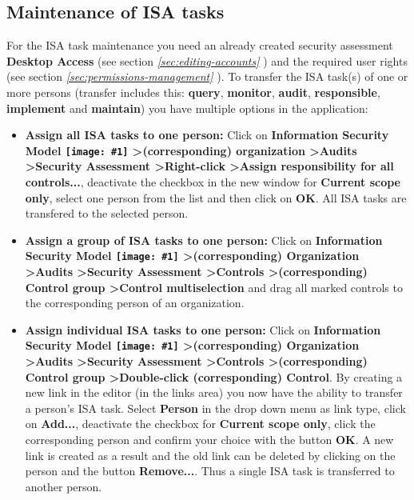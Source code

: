 \documentclass[a4paper,10pt]{book}
\newcommand{\icon}[1]{\texttt{[image: \#1]}}
\begin{document}
\subsection{Maintenance of ISA tasks}

For the ISA task maintenance you need an already created security assessment \textbf{Desktop Access} (see section {\em \ref{sec:editing-accounts} }) and the required user rights (see section {\em \ref{sec:permissions-management} }).
To transfer the ISA task(s) of one or more persons (transfer includes this: \textbf{query}, \textbf{monitor}, \textbf{audit},
\textbf{responsible}, \textbf{implement} and \textbf{maintain}) you have multiple options in the application:
\begin{itemize}
\item \textbf{Assign all ISA tasks to one person:} Click on \textbf{Information Security Model \icon{Icon/Informationssicherheitsmodell.png} \textgreater (corresponding) organization \textgreater Audits \textgreater Security Assessment \textgreater Right-click \textgreater Assign responsibility for all controls...},
deactivate the checkbox in the new window for \textbf{Current scope only}, select one person from the list and then click on \textbf{OK}.
All ISA tasks are transfered to the selected person.
\item \textbf{Assign a group of ISA tasks to one person:} Click on \textbf{Information Security Model \icon{Icon/Informationssicherheitsmodell.png} \textgreater (corresponding) Organization \textgreater Audits \textgreater Security Assessment \textgreater Controls \textgreater (corresponding) Control group \textgreater Control multiselection}
and drag all marked controls to the corresponding person of an organization.
\item \textbf{Assign individual ISA tasks to one person:} Click on \textbf{Information Security Model \icon{Icon/Informationssicherheitsmodell.png} \textgreater (corresponding) Organization \textgreater Audits \textgreater Security Assessment \textgreater Controls \textgreater (corresponding) Control group \textgreater Double-click (corresponding) Control}.
By creating a new link in the editor (in the links area) you now have the ability to transfer a person's ISA task. Select \textbf{Person} in the drop down menu as link type,
click on \textbf{Add...}, deactivate the checkbox for \textbf{Current scope only}, click the corresponding person and confirm your choice with the button \textbf{OK}.
A new link is created as a result and the old link can be deleted by clicking on the person and the button \textbf{Remove...}. Thus a single ISA task is transferred to another person.
\end{itemize}
\end{document}
